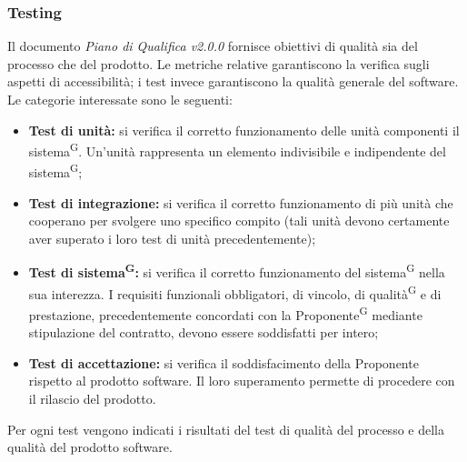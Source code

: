 \documentclass[8pt]{article}
\newcommand{\glossterm}[1]{#1\textsuperscript{G}} %
\begin{document}
\subsubsection{Testing}
Il documento \textit{Piano di Qualifica v2.0.0} fornisce obiettivi di qualità sia del processo che del prodotto. Le metriche relative garantiscono la verifica sugli aspetti di accessibilità; i test invece garantiscono la qualità generale del software. 
\\Le categorie interessate sono le seguenti:
\begin{itemize}
	\item \textbf{Test di unità:} si verifica il corretto funzionamento delle unità componenti il \glossterm{sistema}. Un’unità rappresenta un elemento indivisibile e indipendente del \glossterm{sistema}; 
	\item \textbf{Test di integrazione:} si verifica il corretto funzionamento di più unità che cooperano per svolgere uno specifico compito (tali unità devono certamente aver superato i loro test di unità precedentemente);
	\item \textbf{\glossterm{Test di sistema}:} si verifica il corretto funzionamento del \glossterm{sistema} nella sua interezza. I requisiti funzionali obbligatori, di vincolo, di \glossterm{qualità} e di prestazione, precedentemente concordati con la \glossterm{Proponente} mediante stipulazione del contratto, devono essere soddisfatti per intero;
	\item \textbf{Test di accettazione:} si verifica il soddisfacimento della Proponente rispetto al prodotto software. Il loro superamento permette di procedere con il rilascio del prodotto.
\end{itemize}
Per ogni test vengono indicati i risultati del test di qualità del processo e della qualità del prodotto software.
\end{document}
